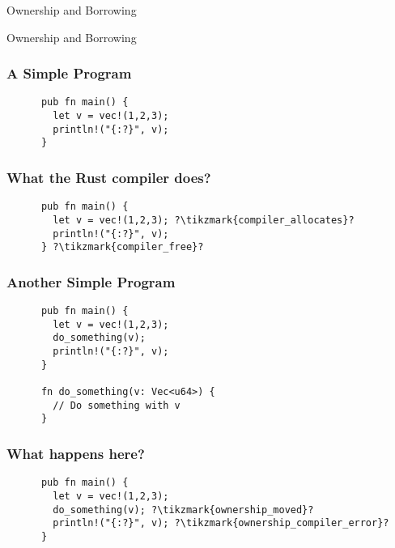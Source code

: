 \begin{section}{Ownership and Borrowing}

  \begin{frame}
    \centerline{
      \huge{Ownership and Borrowing}
    }
  \end{frame}

  \begin{frame}[fragile]
    \frametitle{A Simple Program}
    \begin{verbatim}
      pub fn main() {
        let v = vec!(1,2,3);
        println!("{:?}", v);
      }
    \end{verbatim}
  \end{frame}

  \begin{frame}[fragile]
    \frametitle{What the Rust compiler does?}
    \begin{verbatim}
      pub fn main() {
        let v = vec!(1,2,3); ?\tikzmark{compiler_allocates}?
        println!("{:?}", v);
      } ?\tikzmark{compiler_free}?
    \end{verbatim}
  \end{frame}

  \begin{frame}[fragile]
    \frametitle{Another Simple Program}
    \begin{verbatim}
      pub fn main() {
        let v = vec!(1,2,3);
        do_something(v);
        println!("{:?}", v);
      }

      fn do_something(v: Vec<u64>) {
        // Do something with v
      }
    \end{verbatim}
  \end{frame}

  \begin{frame}[fragile]
    \frametitle{What happens here?}
    \begin{verbatim}
      pub fn main() {
        let v = vec!(1,2,3);
        do_something(v); ?\tikzmark{ownership_moved}?
        println!("{:?}", v); ?\tikzmark{ownership_compiler_error}?
      }


\end{verbatim}
\end{frame}
\end{section}
